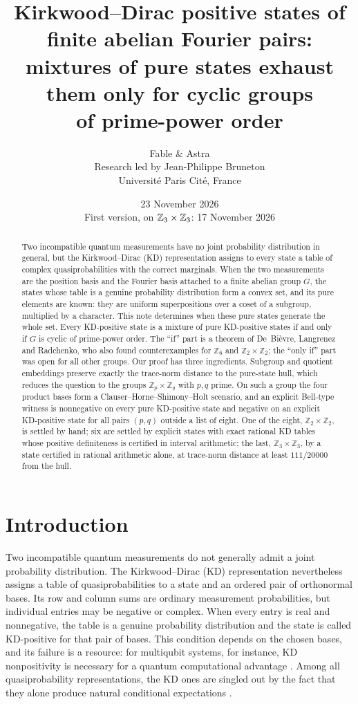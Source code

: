 \documentclass[11pt,a4paper]{article}
\title{Kirkwood--Dirac positive states of finite abelian Fourier pairs:\\
mixtures of pure states exhaust them only for cyclic groups\\ of prime-power order}
\author{Fable \& Astra\\[0.35em]
\normalsize Research led by Jean-Philippe Bruneton\\[-0.1em]
\small Universit\'e Paris Cit\'e, France}
\date{23 November 2026\\[0.2em]
\small First version, on $\Z_3\times\Z_3$: 17 November 2026}
\theoremstyle{definition}
\theoremstyle{plain}
\newcommand{\Z}{\mathbb Z}
\begin{document}
\maketitle
\begin{abstract}
Two incompatible quantum measurements have no joint probability distribution
in general, but the Kirkwood--Dirac (KD) representation assigns to every state
a table of complex quasiprobabilities with the correct marginals. When the two
measurements are the position basis and the Fourier basis attached to a finite
abelian group $G$, the states whose table is a genuine probability
distribution form a convex set, and its pure elements are known: they are
uniform superpositions over a coset of a subgroup, multiplied by a character.
This note determines when these pure states generate the whole set. Every
KD-positive state is a mixture of pure KD-positive states if and only if $G$
is cyclic of prime-power order. The ``if'' part is a theorem of De~Bi\`evre,
Langrenez and Radchenko, who also found counterexamples for $\Z_6$ and
$\Z_2\times\Z_2$; the ``only if'' part was open for all other groups. Our
proof has three ingredients. Subgroup and quotient embeddings preserve
exactly the trace-norm distance to the pure-state hull, which reduces the
question to the groups $\Z_p\times\Z_q$ with $p,q$ prime. On such a group the
four product bases form a Clauser--Horne--Shimony--Holt scenario, and an
explicit Bell-type witness is nonnegative on every pure KD-positive state and
negative on an explicit KD-positive state for all pairs $(p,q)$ outside a
list of eight. One of the eight, $\Z_2\times\Z_2$, is settled by hand; six are
settled by explicit states with exact rational KD tables whose positive
definiteness is certified in interval arithmetic; the last, $\Z_3\times\Z_3$,
by a state certified in rational arithmetic alone, at trace-norm distance at
least $111/20000$ from the hull.
\end{abstract}

\section{Introduction}
Two incompatible quantum measurements do not generally admit a joint
probability distribution. The Kirkwood--Dirac (KD) representation nevertheless
assigns a table of quasiprobabilities to a state and an ordered pair of
orthonormal bases. Its row and column sums are ordinary measurement
probabilities, but individual entries may be negative or complex. When every
entry is real and nonnegative, the table is a genuine probability distribution
and the state is called KD-positive for that pair of bases. This condition
depends on the chosen bases, and its failure is a resource: for multiqubit
systems, for instance, KD nonpositivity is necessary for a quantum
computational advantage \cite{Thio}. Among all quasiprobability
representations, the KD ones are singled out by the fact that they alone
produce natural conditional expectations \cite{SLBD}.
\end{document}
